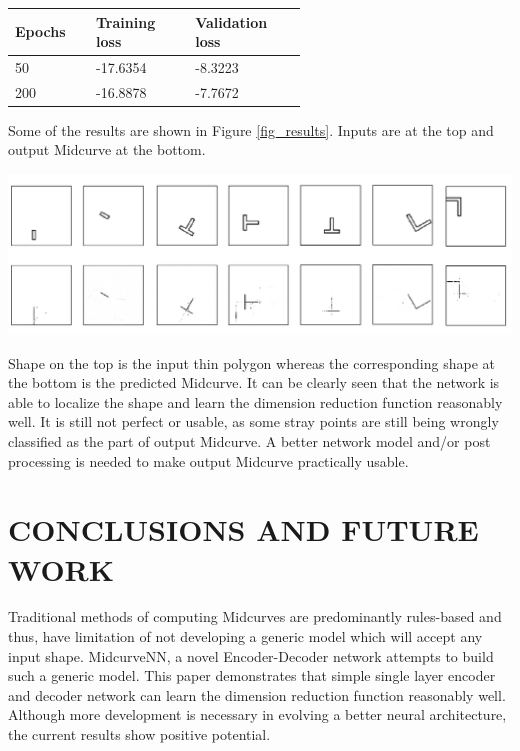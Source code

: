 \documentclass[9pt,academicons]{article}
\begin{document}
\begin{table}[h]
\centering

\begin{tabular}[htbp]{@{} p{0.14\linewidth}  p{0.22\linewidth}  p{0.22\linewidth}  @{}} \toprule
{\bf Epochs } & {\bf Training loss }  & {\bf Validation loss} \\
\midrule
50	& -17.6354	& -8.3223\\
200	& -16.8878	& -7.7672 \\
\bottomrule
\end{tabular}
\label{tbl_loss}
\end{table}


Some of the results are shown in Figure \ref{fig_results}. Inputs are at the top and output Midcurve at the bottom.

     \begin{center}
	\includegraphics[width=\linewidth]{images/Midcurvenn_results}
	\label{fig_results}
    \end{center}

Shape on the top is the input thin polygon whereas the corresponding shape at the bottom is the predicted Midcurve. It can be clearly seen that the network is able to localize the shape and learn the dimension reduction function reasonably well. It is still not perfect or usable, as some stray points are still being wrongly classified as the part of output Midcurve. A better network model and/or post processing is needed to make output Midcurve practically usable.


\section{CONCLUSIONS AND FUTURE WORK}

Traditional methods of computing Midcurves are predominantly rules-based and thus, have limitation of not developing a generic model which will accept any input shape. MidcurveNN, a novel Encoder-Decoder network attempts to build such a generic model. This paper demonstrates that simple single layer encoder and decoder network can learn the dimension reduction function reasonably well. Although more development is necessary in evolving a better neural architecture, the current results show positive potential. 
\end{document}
